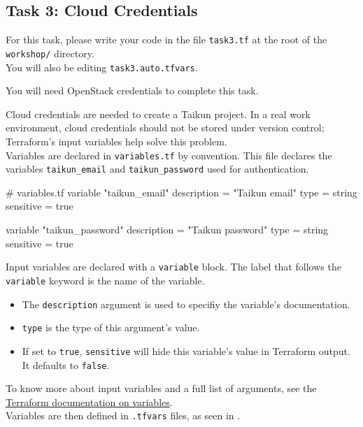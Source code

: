 \subsection{Task 3: Cloud Credentials}\label{sec:task3}

\begin{note}
For this task, please write your code in the file \texttt{task3.tf}
at the root of the \texttt{workshop/} directory.\\
You will also be editing \texttt{task3.auto.tfvars}.
\end{note}

\begin{warn}
You will need OpenStack credentials to complete this task.
\end{warn}

Cloud credentials are needed to create a Taikun project.
In a real work environment,
cloud credentials should not be stored under version control;
Terraform's input variables help solve this problem.\\

Variables are declared in \texttt{variables.tf} by convention.
This file declares the variables \texttt{taikun\_email} and
\texttt{taikun\_password} used for authentication.
\begin{tf}
# variables.tf
variable "taikun_email" {
  description = "Taikun email"
  type        = string
  sensitive   = true
}

variable "taikun_password" {
  description = "Taikun password"
  type        = string
  sensitive   = true
}
\end{tf}

\begin{tip}
  Input variables are declared with a \texttt{variable} block.
  The label that follows the \texttt{variable} keyword is the name of the variable.

  \begin{itemize}
    \item The \texttt{description} argument is used to specifiy the variable's documentation.
    \item \texttt{type} is the type of this argument's value.
    \item If set to \texttt{true}, \texttt{sensitive} will hide this variable's value in Terraform output. It defaults to \texttt{false}.
  \end{itemize}

  To know more about input variables and a full list of arguments,
  see the \href{https://www.terraform.io/docs/language/values/variables.html}{Terraform documentation on variables}.\\

  Variables are then defined in \texttt{.tfvars} files, as seen in .\\
\end{tip}

